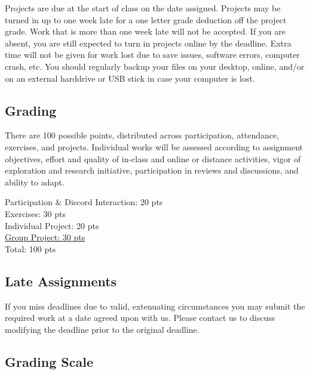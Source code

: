 Projects are due at the start of class on the date assigned. Projects may be turned in up to one week late for a one letter grade deduction off the project grade. Work that is more than one week late will not be accepted. If you are absent, you are still expected to turn in projects online by the deadline. Extra time will not be given for work lost due to save issues, software errors, computer crash, etc. You should regularly backup your files on your desktop, online, and/or on an external harddrive or USB stick in case your computer is lost.

\subsection{Grading}

There are 100 possible points, distributed across participation, attendance, exercises, and projects. Individual works will be assessed according to assignment objectives, effort and quality of in-class and online or distance activities, vigor of exploration and research initiative, participation in reviews and discussions, and ability to adapt.

\hspace*{1em} Participation \& Discord Interaction: 20 pts\\
\hspace*{1em} Exercises: 30 pts\\
\hspace*{1em} Individual Project: 20 pts\\
\hspace*{1em} \ul{Group Project: 30 pts}\\
\hspace*{1em} Total: 100 pts

\subsection{Late Assignments}

If you miss deadlines due to valid, extenuating circumstances you may submit the required work at a date agreed upon with us. Please contact us to discuss modifying the deadline prior to the original deadline.

\subsection{Grading Scale}


